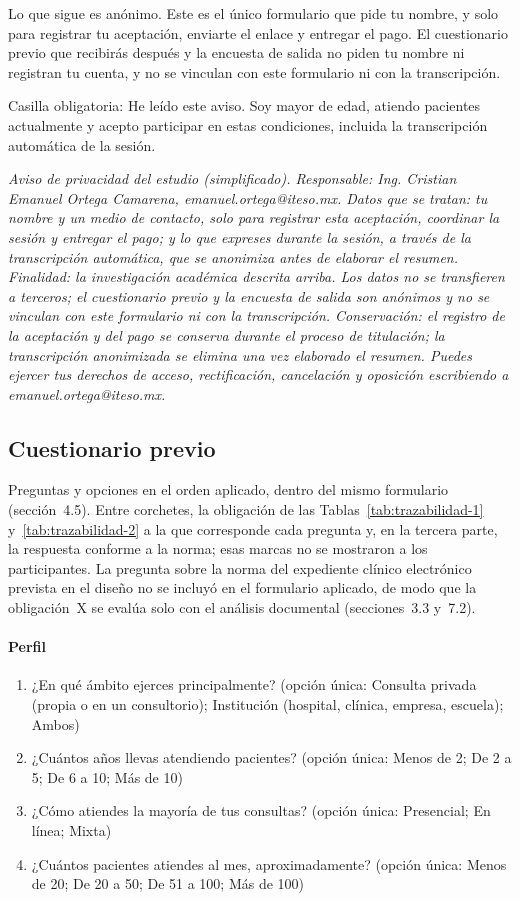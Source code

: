 \documentclass[12pt, a4paper]{article}
\begin{document}
Lo que sigue es anónimo. Este es el único formulario que pide tu nombre, y solo para registrar tu aceptación, enviarte el enlace y entregar el pago. El cuestionario previo que recibirás después y la encuesta de salida no piden tu nombre ni registran tu cuenta, y no se vinculan con este formulario ni con la transcripción.
 
Casilla obligatoria: He leído este aviso. Soy mayor de edad, atiendo pacientes actualmente y acepto participar en estas condiciones, incluida la transcripción automática de la sesión.
 
\textit{Aviso de privacidad del estudio (simplificado). Responsable: Ing. Cristian Emanuel Ortega Camarena, emanuel.ortega@iteso.mx. Datos que se tratan: tu nombre y un medio de contacto, solo para registrar esta aceptación, coordinar la sesión y entregar el pago; y lo que expreses durante la sesión, a través de la transcripción automática, que se anonimiza antes de elaborar el resumen. Finalidad: la investigación académica descrita arriba. Los datos no se transfieren a terceros; el cuestionario previo y la encuesta de salida son anónimos y no se vinculan con este formulario ni con la transcripción. Conservación: el registro de la aceptación y del pago se conserva durante el proceso de titulación; la transcripción anonimizada se elimina una vez elaborado el resumen. Puedes ejercer tus derechos de acceso, rectificación, cancelación y oposición escribiendo a emanuel.ortega@iteso.mx.}
 
\subsection{Cuestionario previo}
\label{anexo:cuestionario}
 
Preguntas y opciones en el orden aplicado, dentro del mismo formulario (sección~4.5). Entre corchetes, la obligación de las Tablas~\ref{tab:trazabilidad-1} y~\ref{tab:trazabilidad-2} a la que corresponde cada pregunta y, en la tercera parte, la respuesta conforme a la norma; esas marcas no se mostraron a los participantes. La pregunta sobre la norma del expediente clínico electrónico prevista en el diseño no se incluyó en el formulario aplicado, de modo que la obligación~X se evalúa solo con el análisis documental (secciones~3.3 y~7.2).
 
\paragraph{Perfil}
\begin{enumerate}
  \item ¿En qué ámbito ejerces principalmente? (opción única: Consulta privada (propia o en un consultorio); Institución (hospital, clínica, empresa, escuela); Ambos)
  \item ¿Cuántos años llevas atendiendo pacientes? (opción única: Menos de 2; De 2 a 5; De 6 a 10; Más de 10)
  \item ¿Cómo atiendes la mayoría de tus consultas? (opción única: Presencial; En línea; Mixta)
  \item ¿Cuántos pacientes atiendes al mes, aproximadamente? (opción única: Menos de 20; De 20 a 50; De 51 a 100; Más de 100)
\end{enumerate}
 
\end{document}
